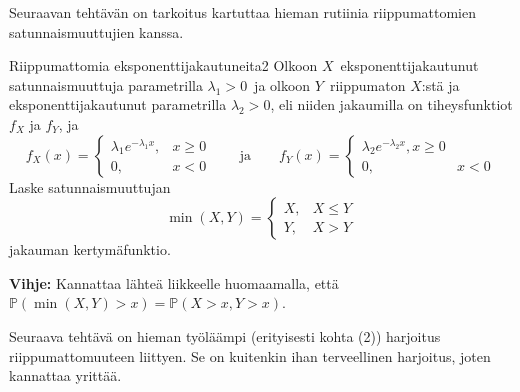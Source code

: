 \documentclass[11pt,a4paper]{amsart}
\newcommand{\1}{\mathbf{1}}
\renewcommand{\P}{\mathbb P}
\begin{document}
Seuraavan tehtävän on tarkoitus kartuttaa hieman rutiinia riippumattomien satunnaismuuttujien kanssa. 

\begin{Exercises}{Riippumattomia eksponenttijakautuneita}{2}
Olkoon $X$ eksponenttijakautunut satunnaismuuttuja parametrilla $\lambda_1>0$ ja olkoon $Y$ riippumaton $X$:stä ja eksponenttijakautunut parametrilla $\lambda_2>0$, eli niiden jakaumilla on tiheysfunktiot $f_X$ ja $f_Y$, ja 
\[
f_X(x)=\begin{cases}
\lambda_1 e^{-\lambda_1x}, & x\geq 0\\
0, & x<0
\end{cases} \qquad \text{ja} \qquad f_Y(x)=\begin{cases}
\lambda_2 e^{-\lambda_2 x}, x\geq 0\\
0, & x<0
\end{cases}
\]
Laske satunnaismuuttujan 
\[
\min(X,Y)=\begin{cases}
X, & X\leq Y\\
Y, & X>Y
\end{cases}
\]
jakauman kertymäfunktio.

\medskip

{\bf Vihje:} Kannattaa lähteä liikkeelle huomaamalla, että $\P(\min(X,Y)> x)=\P(X> x, Y> x)$.



\end{Exercises}

Seuraava tehtävä on hieman työläämpi (erityisesti kohta (2)) harjoitus riippumattomuuteen liittyen. Se on kuitenkin ihan terveellinen harjoitus, joten kannattaa yrittää.
\end{document}
